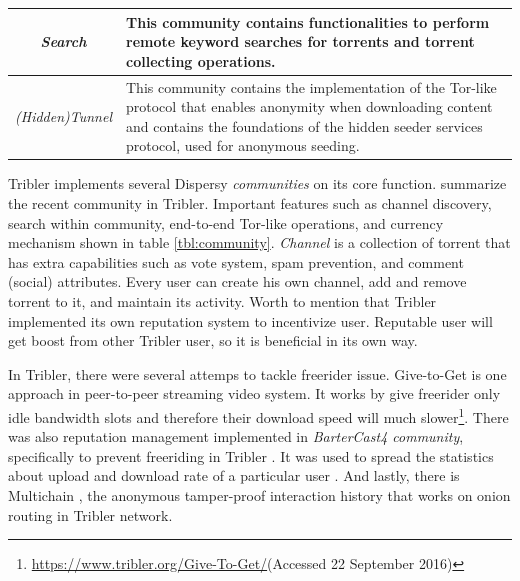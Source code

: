 \begin{table}[tbp]
\begin{tabular}{|c|p{11cm}|}
		\textit{Search}                                                                              & This community contains functionalities to perform remote keyword searches for torrents and torrent collecting operations.                                                                                               \\ \hline
		\textit{(Hidden)Tunnel}                                                                      & This community contains the implementation of the Tor-like protocol that enables anonymity when downloading content and contains the foundations of the hidden seeder services protocol, used for anonymous seeding.     \\ \hline
	\end{tabular}
\end{table}

Tribler implements several Dispersy \textit{communities} on its core function. \citeauthor{2016:tribler-techdebt:vos} summarize the recent community in Tribler. Important features such as channel discovery, search within community, end-to-end Tor-like operations, and currency mechanism shown in table \ref{tbl:community}. \textit{Channel} is a collection of torrent that has extra capabilities such as vote system, spam prevention, and comment (social) attributes. Every user can create his own channel, add and remove torrent to it, and maintain its activity. Worth to mention that Tribler implemented its own reputation system to incentivize user. Reputable user will get boost from other Tribler user, so it is beneficial in its own way.

In Tribler, there were several attemps to tackle freerider issue. Give-to-Get \cite{2008:givetogetvod:Mol} is one approach in peer-to-peer streaming video system. It works by give freerider only idle bandwidth slots and therefore their download speed will much slower\footnote{\url{https://www.tribler.org/Give-To-Get/}(Accessed 22 September 2016)}. There was also reputation management implemented in \textit{BarterCast4 community}, specifically to prevent freeriding in Tribler \cite{2009:bartercast:meulpolder}. It was used to spread the statistics about upload and download rate of a particular user \cite{2016:tribler-techdebt:vos}. And lastly, there is Multichain \cite{2015:multichain:norberhuis}, the anonymous tamper-proof interaction history that works on onion routing in Tribler network.

